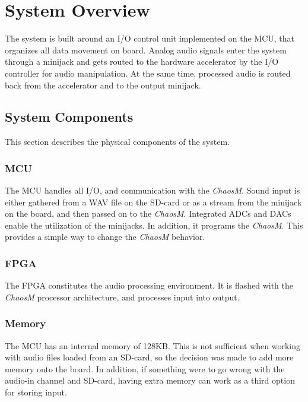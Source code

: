 
\section{System Overview}

The system is built around an I/O control unit implemented on the MCU, that organizes all data movement
on board. Analog audio signals enter the system through a minijack and gets
routed to the hardware accelerator by the I/O controller for audio manipulation.
At the same time, processed audio is routed back from the accelerator and to the
output minijack.

\subsection{System Components}
This section describes the physical components of the system.

\subsubsection{MCU}\label{intro:system-components-mcu}

The MCU handles all I/O, and communication with the \textit{ChaosM}.
Sound input is either gathered from a WAV file on the SD-card or as
a stream from the minijack on the board, and then passed on to the
\textit{ChaosM}. Integrated ADCs and DACs enable the utilization of the
minijacks. In addition, it programs the \textit{ChaosM}. This provides a simple way to
change the \textit{ChaosM} behavior.

\subsubsection{FPGA}

The FPGA constitutes the audio processing environment. It is flashed with the
\textit{ChaosM} processor architecture, and processes input into output.

\subsubsection{Memory}

The MCU has an internal memory of 128KB. This is not sufficient when working
with audio files loaded from an SD-card, so the decision was made to add more
memory onto the board. In addition, if something were to go wrong with the
audio-in channel and SD-card, having extra memory can work as a third option for
storing input.

